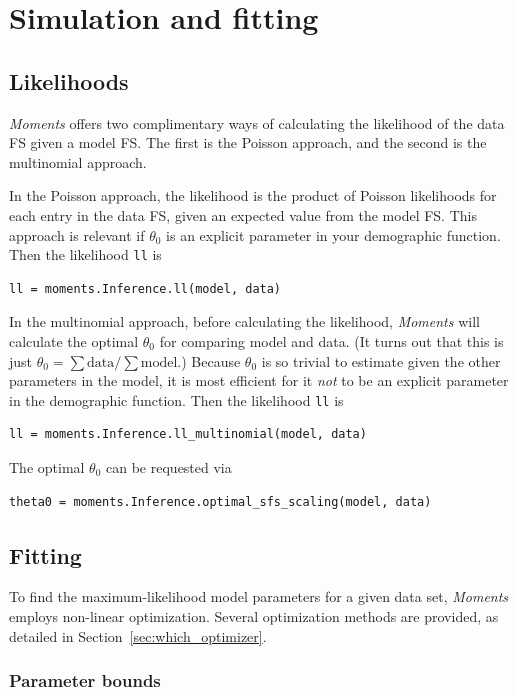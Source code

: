 \documentclass[12pt]{article}
\makeatletter
\newcommand{\py}[1]{\lstinline[breaklines=true,language=Python, showstringspaces=False]@#1@}
\makeatother
\begin{document}
\section{Simulation and fitting}

\subsection{Likelihoods}

\textit{Moments} offers two complimentary ways of calculating the likelihood of the data FS given a model FS.
The first is the Poisson approach, and the second is the multinomial approach.

In the Poisson approach, the likelihood is the product of Poisson likelihoods for each entry in the data FS, given an expected value from the model FS.
This approach is relevant if $\theta_0$ is an explicit parameter in your demographic function.
Then the likelihood \py{ll} is
\begin{lstlisting}
ll = moments.Inference.ll(model, data)
\end{lstlisting}

In the multinomial approach, before calculating the likelihood, \textit{Moments} will calculate the optimal $\theta_0$ for comparing model and data.
(It turns out that this is just $\theta_0 = \sum \text{data} / \sum \text{model}$.)
Because $\theta_0$ is so trivial to estimate given the other parameters in the model, it is most efficient for it \emph{not} to be an explicit parameter in the demographic function.
Then the likelihood \py{ll} is
\begin{lstlisting}
ll = moments.Inference.ll_multinomial(model, data)
\end{lstlisting}
The optimal $\theta_0$ can be requested via
\begin{lstlisting}
theta0 = moments.Inference.optimal_sfs_scaling(model, data)
\end{lstlisting}

\subsection{Fitting}

To find the maximum-likelihood model parameters for a given data set, \textit{Moments} employs non-linear optimization.
Several optimization methods are provided, as detailed in Section~\ref{sec:which_optimizer}.

\subsubsection{Parameter bounds}
\end{document}
